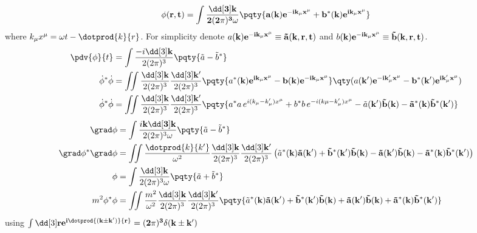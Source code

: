 \documentclass[12pt]{article}
\begin{document}
            \subsubsection{}  { \[
                \phi (\bf r,t) = \int \frac{\dd[3] \bf k}{2 (2\pi)^3 \omega  } \pqty{a(\bf k) e^{ - ik_\mu x^\mu } + b^*(\bf k)e^{ik_\mu x^\mu }}
            \]}
            where \(k_\mu x^\mu = \omega t - \dotprod{k}{r}\). For simplicity denote \(a(\bf k) e^{ - ik_\mu x^\mu }\equiv \tilde{a}(\bf k,\bf r, t)\) and \(b(\bf k) e^{ - ik_\mu x^\mu }\equiv \tilde{b}(\bf k,\bf r, t)\).
            \begin{align*}
                \pdv{\phi }{t} &=  \int \frac{ - i\dd[3] \bf k}{2 (2\pi)^3} \pqty{\tilde{a} - \tilde{b}^*}\\
                \dot{\phi}^* \dot{\phi} &=  \iint \frac{\dd[3] \bf k}{2 (2\pi)^3} \frac{\dd[3] \bf k'}{2 (2\pi)^3}\pqty{a^*(\bf k)e^{ ik_\mu x^\mu} - b(\bf k)e^{ -ik_\mu x^\mu }}\qty(a(\bf k')e^{ - ik'_\mu x^\mu} - b^*(\bf k')e^{ik'_\mu x^\mu }) \\
                \dot{\phi}^* \dot{\phi} &=  \iint \frac{\dd[3] \bf k}{2 (2\pi)^3} \frac{\dd[3] \bf k'}{2 (2\pi)^3}\pqty{a^*a\, e^{i(k_\mu -k'_\mu) x^\mu} + b^*b\, e^{ -i(k\mu -k'_\mu) x^\mu} - \tilde{a}(\bf k')\tilde{b}(\bf k)-\tilde{a}^*(\bf k)\tilde{b}^*(\bf k')}
            \end{align*} \begin{align*}
                \grad\phi &=  \int \frac{ i\bf k\dd[3] \bf k}{2 (2\pi)^3 \omega } \pqty{\tilde{a} - \tilde{b}^*}\\
                \grad \phi^* \grad \phi &=  \iint \frac{\dotprod{k}{k'}}{\omega^2}\frac{\dd[3] \bf k}{2 (2\pi)^3} \frac{\dd[3] \bf k'}{2 (2\pi)^3}\left(\tilde{a}^*(\bf k)\tilde{a}(\bf k')+ \tilde{b}^*(\bf k')\tilde{b}(\bf k) - \tilde{a}(\bf k')\tilde{b}(\bf k)-\tilde{a}^*(\bf k)\tilde{b}^*(\bf k')\right)\\
                \phi &= \int \frac{ \dd[3] \bf k}{2 (2\pi)^3 \omega } \pqty{\tilde{a} + \tilde{b}^*}\\
                m^2\phi^*\phi &= \iint \frac{m^2}{\omega^2} \frac{\dd[3] \bf k}{2 (2\pi)^3} \frac{\dd[3] \bf k'}{2 (2\pi)^3}\pqty{\tilde{a}^*(\bf k)\tilde{a}(\bf k')+ \tilde{b}^*(\bf k')\tilde{b}(\bf k)+ \tilde{a}(\bf k')\tilde{b}(\bf k) +\tilde{a}^*(\bf k)\tilde{b}^*(\bf k')} 
            \end{align*}
            using \(\int \dd[3] \bf r e^{i\dotprod{(k\pm k')}{r}} = (2\pi)^3 \delta (\bf{k \pm k'})\)
\end{document}
